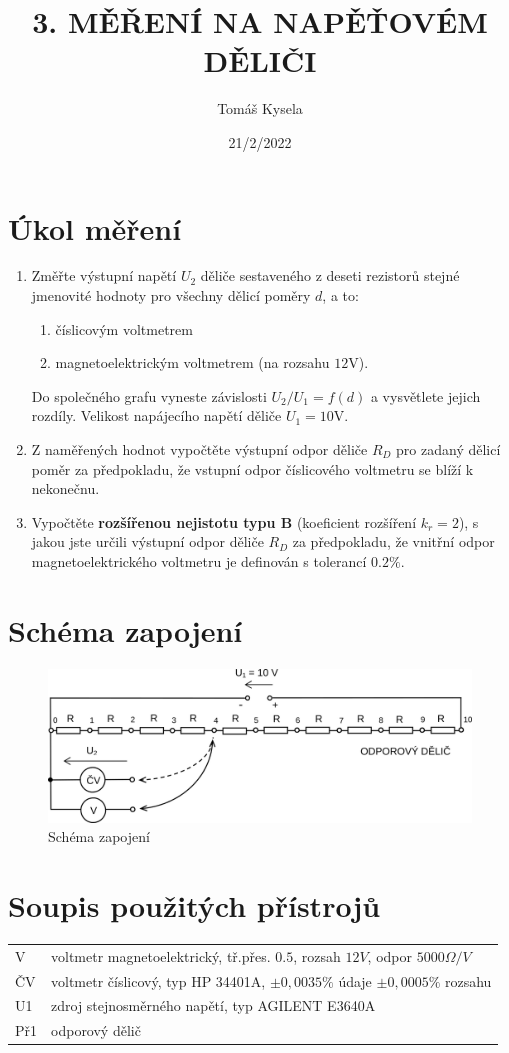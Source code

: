 \documentclass{article}
\title{\textbf{3. MĚŘENÍ NA NAPĚŤOVÉM DĚLIČI}}
\author{Tomáš Kysela}
\date{21/2/2022}
\begin{document}
	
	\maketitle
	
	\section{Úkol měření}
	\begin{enumerate}
		\item Změřte výstupní napětí $U_2$ děliče sestaveného z deseti rezistorů stejné jmenovité hodnoty pro všechny dělicí poměry $d$, a to:
		\begin{enumerate}
			\item číslicovým voltmetrem
			\item magnetoelektrickým voltmetrem (na rozsahu $12 \si{\volt}$).
		\end{enumerate}
		Do společného grafu vyneste závislosti $U_2 /U_1 = f(d)$ a vysvětlete jejich rozdíly. Velikost napájecího napětí děliče $U_1 = 10 \si{\volt}$.
		
		\item Z naměřených hodnot vypočtěte výstupní odpor děliče $R_D$ pro zadaný dělicí poměr za předpokladu, že vstupní odpor číslicového voltmetru se blíží k nekonečnu.
		
		\item Vypočtěte \textbf{rozšířenou nejistotu typu B} (koeficient rozšíření $k_r = 2$), s jakou jste určili výstupní odpor děliče $R_D$ za předpokladu, že vnitřní odpor magnetoelektrického voltmetru je definován s tolerancí $0.2\%$.
	\end{enumerate}
	\section{Schéma zapojení}
	\begin{figure}[htp]
		\centering
		\includegraphics[scale=1.00]{LAB3.png}
		\caption{Schéma zapojení}
	\end{figure}
	\section{Soupis použitých přístrojů}
	\begin{tabular}{ll}
		V   & voltmetr magnetoelektrický, tř.přes. $0.5$, rozsah $12 V$, odpor $5000 \Omega/V$ \\
		ČV  & voltmetr číslicový, typ HP 34401A, $\pm 0,0035 \%$ údaje $\pm 0,0005 \%$ rozsahu \\
		U1  & zdroj stejnosměrného napětí, typ AGILENT E3640A                                  \\
		Př1 & odporový dělič
	\end{tabular}
	
\end{document}
